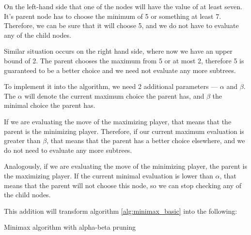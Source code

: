 \documentclass[12pt]{article}
\begin{document}
On the left-hand side that one of the nodes will have the value of at least seven.
It's parent node has to choose the minimum of 5 or something at least 7.
Therefore, we can be sure that it will choose 5, and we do not have to evaluate any of the child nodes.

Similar situation occurs on the right hand side, where now we have an upper bound of 2.
The parent chooses the maximum from 5 or at most 2, therefore 5 is guaranteed to be a better choice and we need not evaluate any more subtrees.

\vfill
To implement it into the algorithm,
we need 2 additional parameters --- $\alpha$ and $\beta$.
The $\alpha$ will denote the current maximum choice the parent has,
and $\beta$ the minimal choice the parent has.

If we are evaluating the move of the maximizing player, that means that the parent is the minimizing player.
Therefore, if our current maximum evaluation is greater than $\beta$, that means that the parent has a better choice elsewhere, and we do not need to evaluate any more subtrees.

\pagebreak[3]
Analogously, if we are evaluating the move of the minimizing player, the parent is the maximizing player.
If the current minimal evaluation is lower than $\alpha$, that means that the parent will not choose this node, so we can stop checking any of the child nodes.

This addition will transform algorithm \ref{alg:minimax_basic} into the following:

\begin{algorithm}[H]
    \DontPrintSemicolon
    \caption{Minimax algorithm with alpha-beta pruning}
    \label{alg:minimax_ab_pruning}
\end{algorithm}
\end{document}
